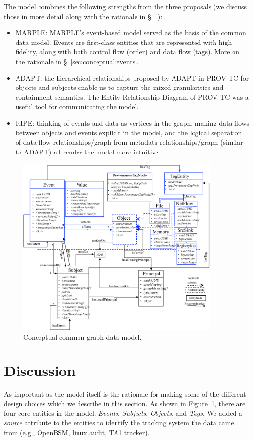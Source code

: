 \documentclass[10pt, conference, onecolumn]{IEEEtran}
\begin{document}
The model combines the following strengths from the three proposals (we discuss those in more detail along with the rationale in \S~\ref{sec:conceptual:credits}):
\begin{itemize}
\item MARPLE: MARPLE's event-based model served as the basis of the common data model. Events are first-class entities that are represented with high fidelity, along with both control flow (order) and data flow (tags). More on the rationale in \S~\ref{sec:conceptual:events}.
\item ADAPT: the hierarchical relationships proposed by ADAPT in PROV-TC for objects and subjects enable us to capture the mixed granularities and containment semantics. The Entity Relationship Diagram of PROV-TC was a useful tool for communicating the model.
\item RIPE: thinking of events and data as vertices in the graph, making data flows between objects and events explicit in the model, and the logical separation of data flow relationships/graph from metadata relationships/graph (similar to ADAPT) all render the model more intuitive.
\end{itemize}
\begin{figure}[htbp]
\centering
\includegraphics[width=0.9\textwidth]{graphmodel}
\caption{Conceptual common graph data model.}
\label{fig:erd}
\end{figure}

\section{Discussion}\label{sec:conceptual:credits}
As important as the model itself is the rationale for making some of the different design choices which we describe in this section.
As shown in Figure~\ref{fig:erd}, there are four core entities in the model: \textit{Events}, \textit{Subjects}, \textit{Objects}, and \textit{Tags}.
We added a \textit{source} attribute to the entities to identify the tracking system the data came from (e.g., OpenBSM, linux audit, TA1 tracker).
\end{document}
